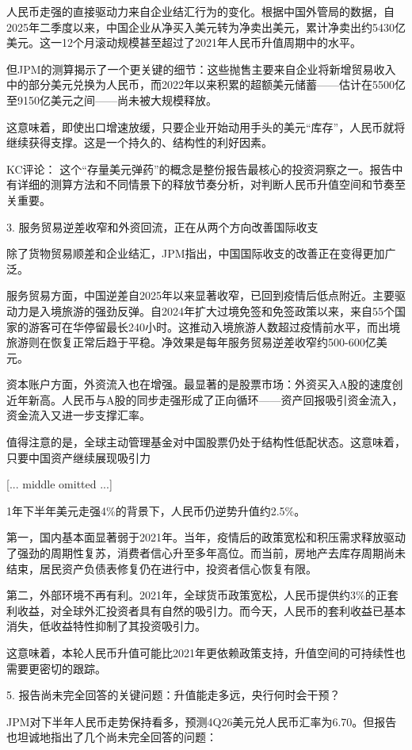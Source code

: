 \documentclass[11pt]{ctexart}
\begin{document}
人民币走强的直接驱动力来自企业结汇行为的变化。根据中国外管局的数据，自2025年二季度以来，中国企业从净买入美元转为净卖出美元，累计净卖出约5430亿美元。这一12个月滚动规模甚至超过了2021年人民币升值周期中的水平。

但JPM的测算揭示了一个更关键的细节：这些抛售主要来自企业将新增贸易收入中的部分美元兑换为人民币，而2022年以来积累的超额美元储蓄——估计在5500亿至9150亿美元之间——尚未被大规模释放。

这意味着，即使出口增速放缓，只要企业开始动用手头的美元“库存”，人民币就将继续获得支撑。这是一个持久的、结构性的利好因素。

KC评论： 这个“存量美元弹药”的概念是整份报告最核心的投资洞察之一。报告中有详细的测算方法和不同情景下的释放节奏分析，对判断人民币升值空间和节奏至关重要。

3. 服务贸易逆差收窄和外资回流，正在从两个方向改善国际收支

除了货物贸易顺差和企业结汇，JPM指出，中国国际收支的改善正在变得更加广泛。

服务贸易方面，中国逆差自2025年以来显著收窄，已回到疫情后低点附近。主要驱动力是入境旅游的强劲反弹。自2024年扩大过境免签和免签政策以来，来自55个国家的游客可在华停留最长240小时。这推动入境旅游人数超过疫情前水平，而出境旅游则在恢复正常后趋于平稳。净效果是每年服务贸易逆差收窄约500-600亿美元。

资本账户方面，外资流入也在增强。最显著的是股票市场：外资买入A股的速度创近年新高。人民币与A股的同步走强形成了正向循环——资产回报吸引资金流入，资金流入又进一步支撑汇率。

值得注意的是，全球主动管理基金对中国股票仍处于结构性低配状态。这意味着，只要中国资产继续展现吸引力

[... middle omitted ...]

1年下半年美元走强4\%的背景下，人民币仍逆势升值约2.5\%。

第一，国内基本面显著弱于2021年。当年，疫情后的政策宽松和积压需求释放驱动了强劲的周期性复苏，消费者信心升至多年高位。而当前，房地产去库存周期尚未结束，居民资产负债表修复仍在进行中，投资者信心恢复有限。

第二，外部环境不再有利。2021年，全球货币政策宽松，人民币提供约3\%的正套利收益，对全球外汇投资者具有自然的吸引力。而今天，人民币的套利收益已基本消失，低收益特性抑制了其投资吸引力。

这意味着，本轮人民币升值可能比2021年更依赖政策支持，升值空间的可持续性也需要更密切的跟踪。

5. 报告尚未完全回答的关键问题：升值能走多远，央行何时会干预？

JPM对下半年人民币走势保持看多，预测4Q26美元兑人民币汇率为6.70。但报告也坦诚地指出了几个尚未完全回答的问题：
\end{document}

